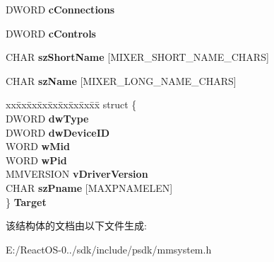\begin{DoxyCompactItemize}
D\+W\+O\+RD {\bfseries c\+Connections}
\item 
\mbox{\label{structtag_m_i_x_e_r_l_i_n_e_a_a95f7fbbec8e940c585a7465d90b83d48}} 
D\+W\+O\+RD {\bfseries c\+Controls}
\item 
\mbox{\label{structtag_m_i_x_e_r_l_i_n_e_a_a2efbd568b6fc135b3a5a3a78b89c4822}} 
C\+H\+AR {\bfseries sz\+Short\+Name} \mbox{[}M\+I\+X\+E\+R\+\_\+\+S\+H\+O\+R\+T\+\_\+\+N\+A\+M\+E\+\_\+\+C\+H\+A\+RS\mbox{]}
\item 
\mbox{\label{structtag_m_i_x_e_r_l_i_n_e_a_ab7003823c61382fca38218da351ab2fb}} 
C\+H\+AR {\bfseries sz\+Name} \mbox{[}M\+I\+X\+E\+R\+\_\+\+L\+O\+N\+G\+\_\+\+N\+A\+M\+E\+\_\+\+C\+H\+A\+RS\mbox{]}
\item 
\mbox{\label{structtag_m_i_x_e_r_l_i_n_e_a_a1e195df4f9cdf5b38f70ec2789e737d7}} 
\begin{tabbing}
xx\=xx\=xx\=xx\=xx\=xx\=xx\=xx\=xx\=\kill
struct \{\\
\>DWORD {\bfseries dwType}\\
\>DWORD {\bfseries dwDeviceID}\\
\>WORD {\bfseries wMid}\\
\>WORD {\bfseries wPid}\\
\>MMVERSION {\bfseries vDriverVersion}\\
\>CHAR {\bfseries szPname} \mbox{[}MAXPNAMELEN\mbox{]}\\
\} {\bfseries Target}\\

\end{tabbing}\end{DoxyCompactItemize}


该结构体的文档由以下文件生成\+:\begin{DoxyCompactItemize}
\item 
E\+:/\+React\+O\+S-\/0../sdk/include/psdk/mmsystem.\+h\end{DoxyCompactItemize}
